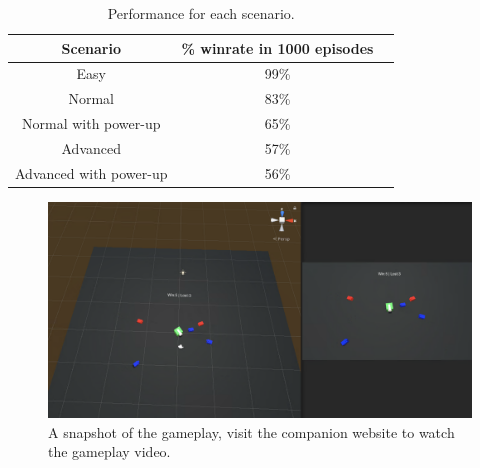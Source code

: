 \documentclass[conference]{IEEEtran}
\begin{document}
\begin{table}[t]
\centering
\caption{Performance for each scenario.}
\begin{tabular}{||c|c|c||}
\hline
\textbf{Scenario} & \textbf{\% winrate in 1000 episodes} \\
\hline
Easy & 99\% \\
\hline
Normal & 83\% \\
Normal with power-up & 65\% \\
\hline
Advanced & 57\% \\
Advanced with power-up & 56\% \\
\hline
\end{tabular}
\label{table_results_winrate}
\end{table}

\begin{figure}[ht]
\centerline{\includegraphics[width=1\textwidth]{assets/gameplay_unity_random_spawn}}
\caption{A snapshot of the gameplay, visit the companion website to watch the gameplay video.}
\label{scene_gameplay_random_spawn}
\end{figure}
\end{document}
